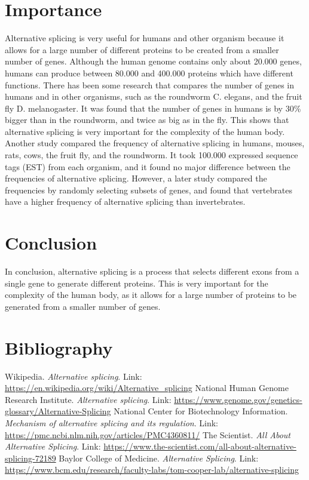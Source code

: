 \documentclass[twocolumn]{article}
\begin{document}
\section{Importance}
Alternative splicing is very useful for humans and other organism because it allows for a large number of different proteins to be created from a smaller number of genes. Although the human genome contains only about 20.000 genes, humans can produce between 80.000 and 400.000 proteins which have different functions. There has been some research that compares the number of genes in humans and in other organisms, such as the roundworm C. elegans, and the fruit fly D. melanogaster. It was found that the number of genes in humans is by 30\% bigger than in the roundworm, and twice as big as in the fly. This shows that alternative splicing is very important for the complexity of the human body. Another study compared the frequency of alternative splicing in humans, mouses, rats, cows, the fruit fly, and the roundworm. It took 100.000 expressed sequence tags (EST) from each organism, and it found no major difference between the frequencies of alternative splicing. However, a later study compared the frequencies by randomly selecting subsets of genes, and found that vertebrates have a higher frequency of alternative splicing than invertebrates.

\section{Conclusion}
In conclusion, alternative splicing is a process that selects different exons from a single gene to generate different proteins. This is very important for the complexity of the human body, as it allows for a large number of proteins to be generated from a smaller number of genes.

\section{Bibliography}
\begin{thebibliography}{99}
     Wikipedia. \textit{Alternative splicing}. Link: \url{https://en.wikipedia.org/wiki/Alternative_splicing}
     National Human Genome Research Institute. \textit{Alternative splicing}. Link: \url{https://www.genome.gov/genetics-glossary/Alternative-Splicing}
     National Center for Biotechnology Information. \textit{Mechanism of alternative splicing and its regulation}. Link: \url{https://pmc.ncbi.nlm.nih.gov/articles/PMC4360811/}
     The Scientist. \textit{All About Alternative Splicing}. Link: \url{https://www.the-scientist.com/all-about-alternative-splicing-72189}
     Baylor College of Medicine. \textit{Alternative Splicing}. Link: \url{https://www.bcm.edu/research/faculty-labs/tom-cooper-lab/alternative-splicing}
\end{thebibliography}
\end{document}

